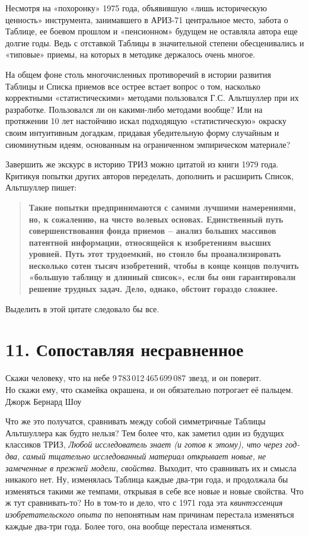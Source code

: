 \documentclass[11pt,a4paper]{article}
\begin{document}
Несмотря на «похоронку» 1975 года, объявившую «лишь историческую ценность»
инструмента, занимавшего в АРИЗ-71 центральное место, забота о Таблице, ее
боевом прошлом и «пенсионном» будущем не оставляла автора еще долгие годы.
Ведь с отставкой Таблицы в значительной степени обесценивались и «типовые»
приемы, на которых в методике держалось очень многое.

На общем фоне столь многочисленных противоречий в истории развития Таблицы и
Списка приемов все острее встает вопрос о том, насколько корректными
«статистическими» методами пользовался Г.С. Альтшуллер при их разработке.
Пользовался ли он какими-либо методами вообще? Или на протяжении 10 лет
настойчиво искал подходящую «статистическую» окраску своим интуитивным
догадкам, придавая убедительную форму случайным и сиюминутным идеям,
основанным на ограниченном эмпирическом материале?

Завершить же экскурс в историю ТРИЗ можно цитатой из книги 1979 года. Критикуя
попытки других авторов переделать, дополнить и расширить Список, Альтшуллер
пишет:
\begin{quote}\bf 
  Такие попытки предпринимаются с самими лучшими намерениями, но, к сожалению,
  на чисто волевых основах. Единственный путь совершенствования фонда приемов
  -- анализ больших массивов патентной информации, относящейся к изобретениям
  высших уровней. Путь этот трудоемкий, но стоило бы проанализировать
  несколько сотен тысяч изобретений, чтобы в конце концов получить «большую
  таблицу и длинный список», если бы они гарантировали решение трудных задач.
  Дело, однако, обстоит гораздо сложнее. \cite[с. 97]{Altshuller1979}
\end{quote}

Выделить в этой цитате следовало бы все.
\clearpage

\section*{11. Сопоставляя несравненное}
\begin{flushright}
  Скажи человеку, что на небе 9\,783\,012\,465\,699\,087 звезд, и он
  поверит. \\ Но скажи ему, что скамейка окрашена, и он обязательно потрогает
  её пальцем.\\ Джорж Бернард Шоу
\end{flushright}

Что же это получатся, сравнивать между собой симметричные Таблицы Альтшуллера
как будто нельзя? Тем более что, как заметил один из будущих классиков ТРИЗ,
\emph{Любой исследователь знает (и готов к этому), что через год-два, самый
  тщательно исследованный материал открывает новые, не замеченные в прежней
  модели, свойства}. Выходит, что сравнивать их и смысла никакого нет. Ну,
изменялась Таблица каждые два-три года, и продолжала бы изменяться такими же
темпами, открывая в себе все новые и новые свойства. Что ж тут сравнивать-то?
Но в том-то и дело, что с 1971 года эта \emph{квинтэссенция изобретательского
  опыта} по непонятным нам причинам перестала изменяться каждые два-три года.
Более того, она вообще перестала изменяться.
\end{document}
